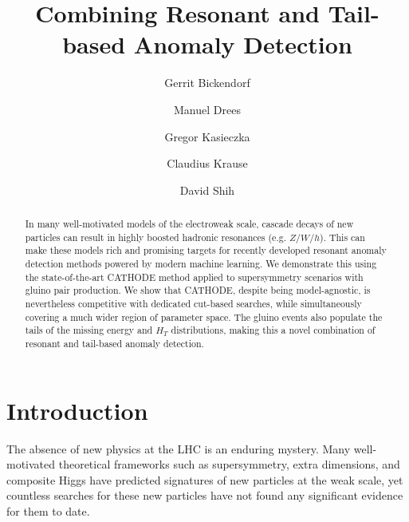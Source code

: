 \documentclass[prd, twocolumn, superscriptaddress,floatfix, nofootinbib, preprintnumbers]{revtex4-2}
\begin{document}
\title{
 Combining Resonant and Tail-based Anomaly Detection
}

\author{Gerrit Bickendorf}


\author{Manuel Drees}

\author{Gregor Kasieczka}

\author{Claudius Krause}

\author{David Shih}



\begin{abstract}
In many well-motivated models of the electroweak scale, cascade decays of new particles can result in highly boosted hadronic resonances (e.g. $Z/W/h$). This can make these models rich and promising targets for recently developed resonant anomaly detection methods powered by modern machine learning. We demonstrate this using the state-of-the-art CATHODE method applied to supersymmetry scenarios with gluino pair production. We show that CATHODE, despite being model-agnostic, is nevertheless competitive with dedicated cut-based searches, while simultaneously covering a much wider region of parameter space. The gluino events also populate the tails of the missing energy and $H_T$ distributions, making this a novel combination of resonant and tail-based anomaly detection.


\end{abstract}

\maketitle


\section{Introduction}

The absence of new physics at the LHC is an enduring mystery. Many well-motivated theoretical frameworks such as supersymmetry, extra dimensions, and composite Higgs have predicted signatures of new particles at the weak scale, yet countless searches for these new particles have not found any significant evidence for them to date. 
\end{document}
